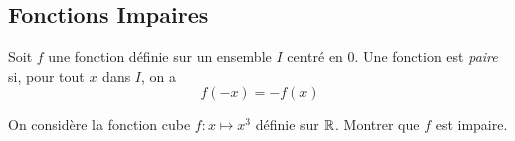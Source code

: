 \documentclass[poly]{mesCours}
\begin{document}
\subsection*{Fonctions Impaires}
\begin{definition}
Soit $f$ une fonction définie sur un ensemble $I$ centré en $0$. Une fonction est \emph{paire} si, pour tout $x$ dans $I$, on a
\begin{equation*}
f(-x) = -f(x)
\end{equation*}
\end{definition}
\begin{example}
On considère la fonction cube $f : x \mapsto x^3$ définie sur $\mathbb{R}$. Montrer que $f$ est impaire.
\end{example}
\vspace*{0.5cm}
\emptybox{3cm}
\vspace*{0.5cm}
\end{document}
